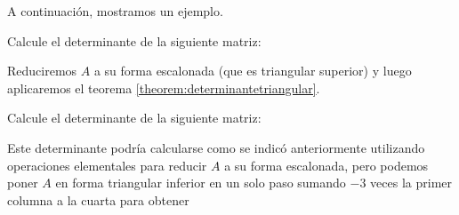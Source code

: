 A continuación, mostramos un ejemplo.

\newpage

\begin{examplebox}{}{}
    Calcule el determinante de la siguiente matriz:
    \begin{matrizn}
    \end{matrizn}

    \tcblower
    \solucion Reduciremos $A$ a su forma escalonada (que es triangular superior) y luego aplicaremos el teorema \ref{theorem:determinantetriangular}.
    \begin{matrizn}
    \end{matrizn}
\end{examplebox}

\begin{examplebox}{}{}
    Calcule el determinante de la siguiente matriz:
    \begin{matrizn}
    \end{matrizn}

    \solucion Este determinante podría calcularse como se indicó anteriormente utilizando operaciones elementales para reducir $A$ a su forma escalonada, pero podemos poner $A$ en forma triangular inferior en un solo paso sumando $-3$ veces la primer columna a la cuarta para obtener
    \begin{matrizn}
    \end{matrizn}
\end{examplebox}

